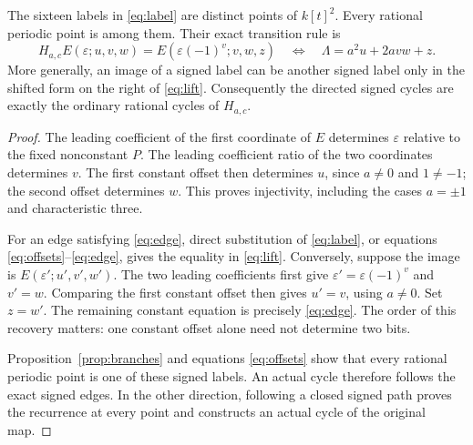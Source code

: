 \begin{proposition}\label{prop:exact}
The sixteen labels in \eqref{eq:label} are distinct points of
$k[t]^2$. Every rational periodic point is among them. Their exact
transition rule is
\begin{equation}\label{eq:lift}
 H_{a,c}E(\varepsilon;u,v,w)
 =E(\varepsilon(-1)^v;v,w,z)
 \quad\Longleftrightarrow\quad
 \Lambda=a^2u+2avw+z.
\end{equation}
More generally, an image of a signed label can be another signed
label only in the shifted form on the right of \eqref{eq:lift}.
Consequently the directed signed cycles are exactly the ordinary
rational cycles of $H_{a,c}$.
\end{proposition}
\begin{proof}
The leading coefficient of the first coordinate of $E$ determines
$\varepsilon$ relative to the fixed nonconstant $P$. The leading
coefficient ratio of the two coordinates determines $v$. The first
constant offset then determines $u$, since $a\ne0$ and $1\ne-1$;
the second offset determines $w$. This proves injectivity, including
the cases $a=\pm1$ and characteristic three.

For an edge satisfying \eqref{eq:edge}, direct substitution of
\eqref{eq:label}, or equations \eqref{eq:offsets}--\eqref{eq:edge},
gives the equality in \eqref{eq:lift}. Conversely, suppose the image
is $E(\varepsilon';u',v',w')$. The two leading coefficients first
give $\varepsilon'=\varepsilon(-1)^v$ and $v'=w$. Comparing the
first constant offset then gives $u'=v$, using $a\ne0$. Set $z=w'$.
The remaining constant equation is precisely \eqref{eq:edge}.
The order of this recovery matters: one constant offset alone need
not determine two bits.

Proposition~\ref{prop:branches} and equations \eqref{eq:offsets}
show that every rational periodic point is one of these signed labels.
An actual cycle therefore follows the exact signed edges. In the
other direction, following a closed signed path proves the recurrence
at every point and constructs an actual cycle of the original map.
\end{proof}
